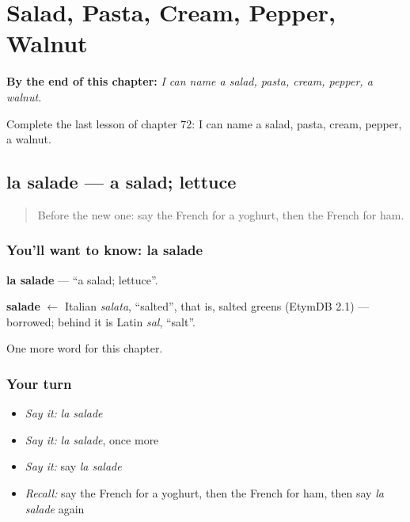 
\chapter{Salad, Pasta, Cream, Pepper, Walnut}
\label{ch:fr-salad-pasta-cream-pepper-walnut}

\begin{chapteropening}
\textbf{By the end of this chapter:} \emph{I can name a salad, pasta, cream, pepper, a walnut.}

Complete the last lesson of chapter 72: I can name a salad, pasta, cream, pepper, a walnut.
\end{chapteropening}

\section[la salade]{la salade — a salad; lettuce}

\label{lesson:FR-C72-salade}



\begin{quote}
Before the new one: say the French for a yoghurt, then the French for ham.
\end{quote}

\subsection*{You'll want to know: la salade}
\textbf{la salade} — \textquotedblleft{}a salad; lettuce\textquotedblright{}.

\begin{cousinweb}
\textbf{salade} $\leftarrow$ Italian \emph{salata}, \textquotedblleft{}salted\textquotedblright{}, that is, salted greens (EtymDB 2.1) — borrowed; behind it is Latin \emph{sal}, \textquotedblleft{}salt\textquotedblright{}.
\end{cousinweb}

\begin{grammarlens}[title={What you've built}]
One more word for this chapter.
\end{grammarlens}

\subsection*{Your turn}
\begin{itemize}
\raggedright
  \item \emph{Say it:} \emph{la salade}
  \item \emph{Say it:} \emph{la salade}, once more
  \item \emph{Say it:} say \emph{la salade}
  \item \emph{Recall:} say the French for a yoghurt, then the French for ham, then say \emph{la salade} again
\end{itemize}

